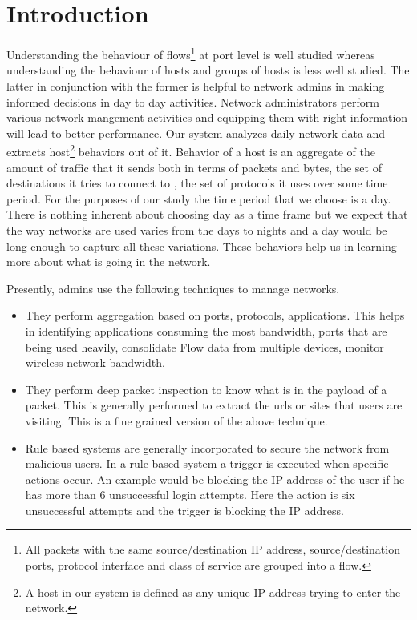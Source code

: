 
\chapter{Introduction}

Understanding the behaviour of flows\footnote{All packets with the same source/destination IP address, source/destination ports, protocol interface and class of service are grouped into a flow.} at port level is well studied whereas understanding the behaviour of hosts and groups of hosts is less well studied. The latter in conjunction with the former is helpful to network admins in making informed decisions in day to day activities. Network administrators perform various network mangement activities and equipping them with right information will lead to better performance. 
Our system analyzes daily network data and extracts host\footnote{A host in our system is defined as any unique IP address trying to enter the network.} behaviors out of it.  Behavior of a host is an aggregate of the amount of traffic that it sends both in terms of packets and bytes, the set of destinations it tries to connect to , the set of protocols it uses over some time period. For the purposes of our study the time period that we choose is a day. There is nothing inherent about choosing day as a time frame but we expect that the way networks are used varies from the days to nights and a day would be long enough to capture all these variations. These behaviors help us in learning more about what is going in the network. 

Presently, admins use the following techniques to manage networks. 
\begin{itemize}
	\item They perform aggregation based on ports, protocols, applications. This helps in identifying applications consuming the most bandwidth, ports that are being used heavily, consolidate Flow data from multiple devices, monitor wireless network bandwidth.
	
	\item They perform deep packet inspection to know what is in the payload of a packet. This is generally performed to extract the urls or sites that users are  visiting. This is a fine grained version of the above technique.
	
	\item Rule based systems are generally incorporated to secure the network from malicious users. In a rule based system a trigger is executed when specific actions occur. An example would be blocking the IP address of the user if he has more than 6 unsuccessful login attempts. Here the action is six unsuccessful attempts and the trigger is blocking the IP address. 
\end{itemize}


